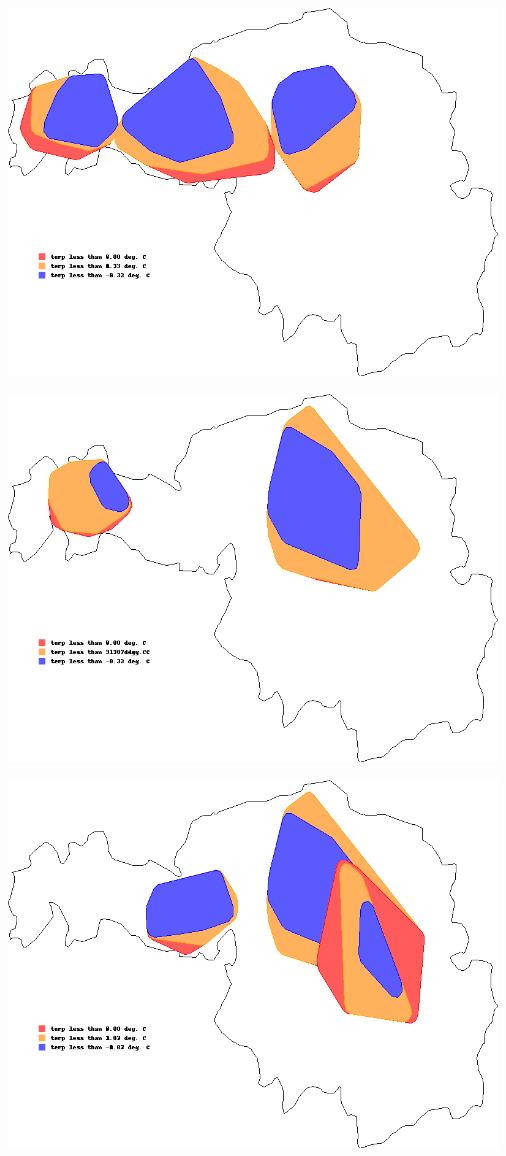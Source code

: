 \documentclass[12pt]{article}
\begin{document}
\includegraphics[width=35em]{images/iso_Lachtal_2008-03-02.png}

\includegraphics[width=35em]{images/iso_Pitztal_2008-03-02.png}

\includegraphics[width=35em]{images/iso_Kitzbuhel_2008-03-02-1.png}
\end{document}
